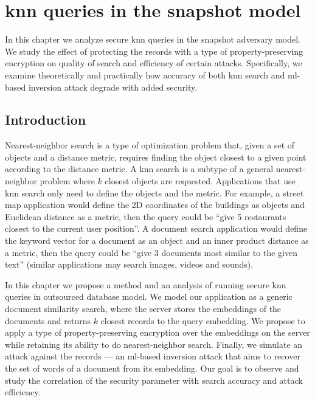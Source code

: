 \chapter{\texorpdfstring{\acrshort{knn}}{kNN} queries in the snapshot model}\label{section:knn-snapshot}
\thispagestyle{myheadings}

	In this chapter we analyze secure \acrshort{knn} queries in the snapshot adversary model.
	We study the effect of protecting the records with a type of property-preserving encryption on quality of search and efficiency of certain attacks.
	Specifically, we examine theoretically and practically how accuracy of both \acrshort{knn} search and \acrshort{ml}-based inversion attack degrade with added security.

	\section{Introduction}

		Nearest-neighbor search is a type of optimization problem that, given a set of objects and a distance metric, requires finding the object closest to a given point according to the distance metric.
		A \acrfull{knn} search is a subtype of a general nearest-neighbor problem where $k$ closest objects are requested.
		Applications that use \acrshort{knn} search only need to define the objects and the metric.
		For example, a street map application would define the 2D coordinates of the buildings as objects and Euclidean distance as a metric, then the query could be ``give 5 restaurants closest to the current user position''.
		A document search application would define the keyword vector for a document as an object and an inner product distance as a metric, then the query could be ``give 3 documents most similar to the given text'' (similar applications may search images, videos and sounds).

		In this chapter we propose a method and an analysis of running secure \acrshort{knn} queries in outsourced database model.
		We model our application as a generic document similarity search, where the server stores the embeddings of the documents and returns $k$ closest records to the query embedding.
		We propose to apply a type of property-preserving encryption over the embeddings on the server while retaining its ability to do nearest-neighbor search.
		Finally, we simulate an attack against the records --- an \acrshort{ml}-based inversion attack that aims to recover the set of words of a document from its embedding.
		Our goal is to observe and study the correlation of the security parameter with search accuracy and attack efficiency.

